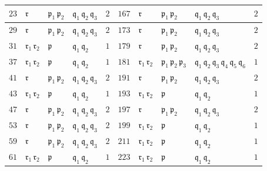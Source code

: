 \begin{figure}
\begin{center}
\begin{tabular}{x{0.75cm}x{1cm}x{1.25cm}x{2.5cm}x{0.75cm}x{0.75cm}x{1cm}x{1.25cm}x{2.5cm}x{0.75cm}}
      \hline
      $23$ & $\mathfrak{r}$ & $\mathfrak{p}_1\,\mathfrak{p}_2$ & $\mathfrak{q}_1\,\mathfrak{q}_2\,\mathfrak{q}_3$ & $2$ & $167$ & $\mathfrak{r}$ & $\mathfrak{p}_1\,\mathfrak{p}_2$ & $\mathfrak{q}_1\,\mathfrak{q}_2\,\mathfrak{q}_3$ & $2$ \tabularnewline
      \hline
      $29$ & $\mathfrak{r}$ & $\mathfrak{p}_1\,\mathfrak{p}_2$ & $\mathfrak{q}_1\,\mathfrak{q}_2\,\mathfrak{q}_3$ & $2$ & $173$ & $\mathfrak{r}$ & $\mathfrak{p}_1\,\mathfrak{p}_2$ & $\mathfrak{q}_1\,\mathfrak{q}_2\,\mathfrak{q}_3$ & $2$ \tabularnewline
      \hline
      $31$ & $\mathfrak{r}_1\,\mathfrak{r}_2$ & $\mathfrak{p}$ & $\mathfrak{q}_1\,\mathfrak{q}_2$ & $1$ & $179$ & $\mathfrak{r}$ & $\mathfrak{p}_1\,\mathfrak{p}_2$ & $\mathfrak{q}_1\,\mathfrak{q}_2\,\mathfrak{q}_3$ & $2$ \tabularnewline
      \hline
      $37$ & $\mathfrak{r}_1\,\mathfrak{r}_2$ & $\mathfrak{p}$ & $\mathfrak{q}_1\,\mathfrak{q}_2$ & $1$ & $181$ & $\mathfrak{r}_1\,\mathfrak{r}_2$ & $\mathfrak{p}_1\,\mathfrak{p}_2\,\mathfrak{p}_3$ & $\mathfrak{q}_1\,\mathfrak{q}_2\,\mathfrak{q}_3\,\mathfrak{q}_4\,\mathfrak{q}_5\,\mathfrak{q}_6$ & $1$ \tabularnewline
      \hline
      $41$ & $\mathfrak{r}$ & $\mathfrak{p}_1\,\mathfrak{p}_2$ & $\mathfrak{q}_1\,\mathfrak{q}_2\,\mathfrak{q}_3$ & $2$ & $191$ & $\mathfrak{r}$ & $\mathfrak{p}_1\,\mathfrak{p}_2$ & $\mathfrak{q}_1\,\mathfrak{q}_2\,\mathfrak{q}_3$ & $2$ \tabularnewline
      \hline
      $43$ & $\mathfrak{r}_1\,\mathfrak{r}_2$ & $\mathfrak{p}$ & $\mathfrak{q}_1\,\mathfrak{q}_2$ & $1$ & $193$ & $\mathfrak{r}_1\,\mathfrak{r}_2$ & $\mathfrak{p}$ & $\mathfrak{q}_1\,\mathfrak{q}_2$ & $1$ \tabularnewline
      \hline
      $47$ & $\mathfrak{r}$ & $\mathfrak{p}_1\,\mathfrak{p}_2$ & $\mathfrak{q}_1\,\mathfrak{q}_2\,\mathfrak{q}_3$ & $2$ & $197$ & $\mathfrak{r}$ & $\mathfrak{p}_1\,\mathfrak{p}_2$ & $\mathfrak{q}_1\,\mathfrak{q}_2\,\mathfrak{q}_3$ & $2$ \tabularnewline
      \hline
      $53$ & $\mathfrak{r}$ & $\mathfrak{p}_1\,\mathfrak{p}_2$ & $\mathfrak{q}_1\,\mathfrak{q}_2\,\mathfrak{q}_3$ & $2$ & $199$ & $\mathfrak{r}_1\,\mathfrak{r}_2$ & $\mathfrak{p}$ & $\mathfrak{q}_1\,\mathfrak{q}_2$ & $1$ \tabularnewline
      \hline
      $59$ & $\mathfrak{r}$ & $\mathfrak{p}_1\,\mathfrak{p}_2$ & $\mathfrak{q}_1\,\mathfrak{q}_2\,\mathfrak{q}_3$ & $2$ & $211$ & $\mathfrak{r}_1\,\mathfrak{r}_2$ & $\mathfrak{p}$ & $\mathfrak{q}_1\,\mathfrak{q}_2$ & $1$ \tabularnewline
      \hline
      $61$ & $\mathfrak{r}_1\,\mathfrak{r}_2$ & $\mathfrak{p}$ & $\mathfrak{q}_1\,\mathfrak{q}_2$ & $1$ & $223$ & $\mathfrak{r}_1\,\mathfrak{r}_2$ & $\mathfrak{p}$ & $\mathfrak{q}_1\,\mathfrak{q}_2$ & $1$ \tabularnewline

\end{tabular}
\end{center}
\end{figure}
